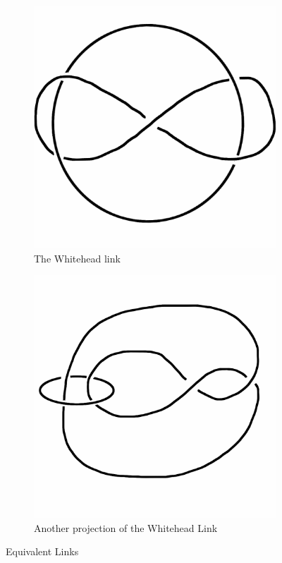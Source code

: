\documentclass[12pt,letterpaper]{article}
\theoremstyle{definition}
\begin{document}
\begin{figure}[h]
     \centering
        \begin{subfigure}{.45\textwidth}
        \centering
        \includegraphics[width=\textwidth]{knotpics/whitehead1.png}
        \caption{The Whitehead link}
    \end{subfigure}
    \quad
    \begin{subfigure}{.45\textwidth}
        \centering
        \includegraphics[width=\textwidth]{knotpics/whitehead2.png}
        \caption{Another projection of the Whitehead Link}
    \end{subfigure}
    \caption{Equivalent Links}
\end{figure}
\end{document}

